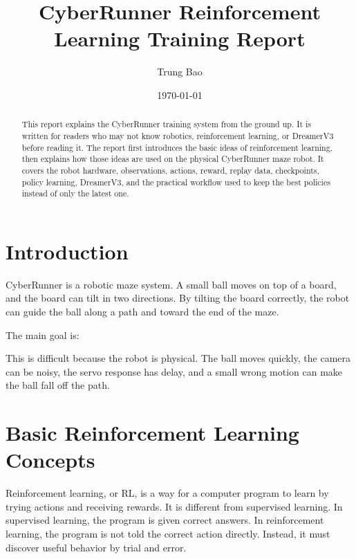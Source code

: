 \documentclass[11pt]{article}
\title{CyberRunner Reinforcement Learning Training Report}
\author{Trung Bao}
\date{\today}
\begin{document}
\maketitle

\begin{abstract}
This report explains the CyberRunner training system from the ground up. It is written for readers who may not know robotics, reinforcement learning, or DreamerV3 before reading it. The report first introduces the basic ideas of reinforcement learning, then explains how those ideas are used on the physical CyberRunner maze robot. It covers the robot hardware, observations, actions, reward, replay data, checkpoints, policy learning, DreamerV3, and the practical workflow used to keep the best policies instead of only the latest one.
\end{abstract}

\tableofcontents
\newpage

\section{Introduction}

CyberRunner is a robotic maze system. A small ball moves on top of a board, and the board can tilt in two directions. By tilting the board correctly, the robot can guide the ball along a path and toward the end of the maze.

The main goal is:

\begin{center}
\end{center}

This is difficult because the robot is physical. The ball moves quickly, the camera can be noisy, the servo response has delay, and a small wrong motion can make the ball fall off the path.

\section{Basic Reinforcement Learning Concepts}

Reinforcement learning, or RL, is a way for a computer program to learn by trying actions and receiving rewards. It is different from supervised learning. In supervised learning, the program is given correct answers. In reinforcement learning, the program is not told the correct action directly. Instead, it must discover useful behavior by trial and error.
\end{document}
